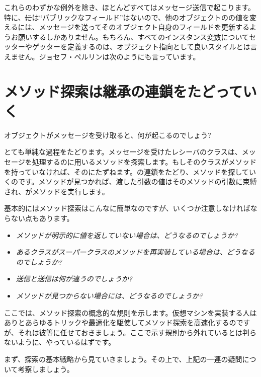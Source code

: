 \documentclass[a4paper,10pt,twoside]{book}
\begin{document}
これらのわずかな例外を除き、ほとんどすべてはメッセージ送信で起こります。特に、\st には``パブリックなフィールド''はないので、他のオブジェクトのの値を変えるには、メッセージを送ってそのオブジェクト自身のフィールドを更新するようお願いするしかありません。もちろん、すべてのインスタンス変数についてセッターやゲッターを定義するのは、オブジェクト指向として良いスタイルとは言えません。ジョセフ・ペルリンは次のようにも言っています。



\section{メソッド探索は継承の連鎖をたどっていく}


オブジェクトがメッセージを受け取ると、何が起こるのでしょう?

とても単純な過程をたどります。メッセージを受けたレシーバのクラスは、メッセージを処理するのに用いるメソッドを探索します。もしそのクラスがメソッドを持っていなければ、そのにたずねます。の連鎖をたどり、メソッドを探していくのです。メソッドが見つかれば、渡した引数の値はそのメソッドの引数に束縛され、がメソッドを実行します。

基本的にはメソッド探索はこんなに簡単なのですが、いくつか注意しなければならない点もあります。

\begin{itemize}
  \item \emph{メソッドが明示的に値を返していない場合は、どうなるのでしょうか?}
  \item \emph{あるクラスがスーパークラスのメソッドを再実装している場合は、どうなるのでしょうか?}
  \item \emph{送信と送信は何が違うのでしょうか?}
  \item \emph{メソッドが見つからない場合には、どうなるのでしょうか?}
\end{itemize}

ここでは、メソッド探索の概念的な規則を示します。仮想マシンを実装する人はありとあらゆるトリックや最適化を駆使してメソッド探索を高速化するのですが、それは彼等に任せておきましょう。ここで示す規則から外れているとは判らないように、やっているはずです。

まず、探索の基本戦略から見ていきましょう。その上で、上記の一連の疑問について考察しましょう。
\end{document}
